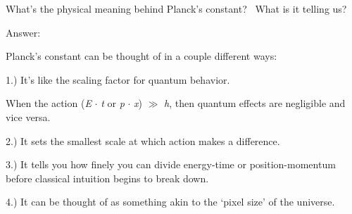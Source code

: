 What's the physical meaning behind Planck's constant? \ What is it telling us?

Answer:

Planck's constant can be thought of in a couple different ways:

1.) It's like the scaling factor for quantum behavior.

When the action (\textit{E} $\cdot$ \textit{t} or
\textit{p} $\cdot$ \textit{x}) $\gg$ \textit{h},
then quantum effects are negligible and vice versa.

2.) It sets the smallest scale at which action makes a difference.

3.) It tells you how finely you can divide energy-time or position-momentum
before classical intuition begins to break down.

4.) It can be thought of as something akin to the `pixel size' of the universe.